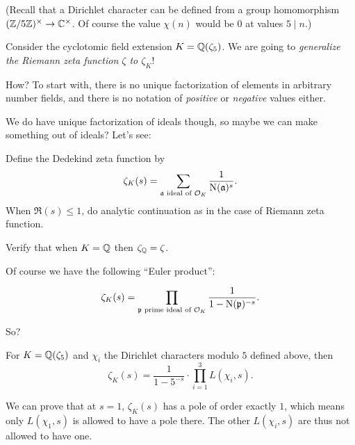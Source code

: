 (Recall that a Dirichlet character can be defined from a group homomorphism $(\mathbb Z/5\mathbb Z)^\times \to
\mathbb C^{\times}$. Of course the value $\chi(n)$ would be $0$ at values $5 \mid n$.)

Consider the cyclotomic field extension $K = \mathbb Q(\zeta_5)$.
We are going to \emph{generalize the Riemann zeta function $\zeta$ to $\zeta_K$}!

How? To start with, there is no unique factorization of elements in arbitrary number fields,
and there is no notation of \emph{positive} or \emph{negative} values either.

We do have unique factorization of ideals though, so maybe we can make something out of ideals?
Let's see:
\begin{definition} %
	Define the Dedekind zeta function by
	\[ \zeta_K(s) = \sum_{\mathfrak a\text{ ideal of }\mathcal O_K} \frac{1}{\operatorname{N}(\mathfrak a)^s}. \]
	When $\Re(s) \leq 1$, do analytic continuation as in the case of Riemann zeta function.
\end{definition}
\begin{exercise}
	Verify that when $K = \mathbb Q$ then $\zeta_\mathbb Q = \zeta$.
\end{exercise}

Of course we have the following ``Euler product'':
\begin{proposition}
	\[ \zeta_K(s) = \prod_{\mathfrak p\text{ prime ideal of }\mathcal O_K} \frac{1}{1-\operatorname{N}(\mathfrak p)^{-s}}. \]
\end{proposition}

So?
\begin{proposition} %
	For $K = \mathbb Q(\zeta_5)$ and $\chi_i$ the Dirichlet characters modulo $5$ defined above, then
	\[ \zeta_K(s) = \frac{1}{1-5^{-s}} \cdot \prod_{i=1}^{3} L(\chi_i, s). \]
\end{proposition}
We can prove that at $s = 1$, $\zeta_K(s)$ has a pole of order exactly $1$,
which means only $L(\chi_1, s)$ is allowed to have a pole there.
The other $L(\chi_i, s)$ are thus not allowed to have one.

